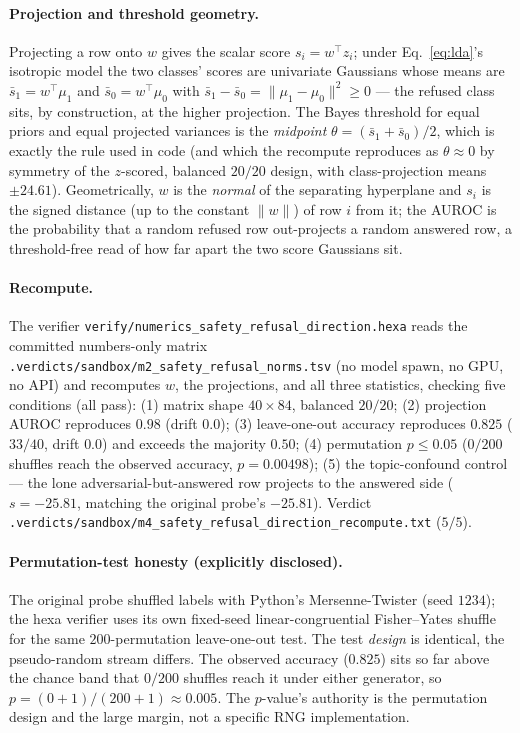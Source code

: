\documentclass[11pt,a4paper]{article}
\begin{document}
\paragraph{Projection and threshold geometry.} Projecting a row onto \(w\) gives
the scalar score \(s_i = w^{\top}z_i\); under Eq.~\eqref{eq:lda}'s isotropic
model the two classes' scores are univariate Gaussians whose means are
\(\bar s_1 = w^{\top}\mu_1\) and \(\bar s_0 = w^{\top}\mu_0\) with
\(\bar s_1 - \bar s_0 = \lVert\mu_1-\mu_0\rVert^2 \ge 0\) --- the refused class
sits, by construction, at the higher projection. The Bayes threshold for equal
priors and equal projected variances is the \emph{midpoint}
\(\theta = (\bar s_1+\bar s_0)/2\), which is exactly the rule used in code (and
which the recompute reproduces as \(\theta \approx 0\) by symmetry of the
\(z\)-scored, balanced \(20/20\) design, with class-projection means
\(\pm 24.61\)). Geometrically, \(w\) is the \emph{normal} of the separating
hyperplane and \(s_i\) is the signed distance (up to the constant
\(\lVert w\rVert\)) of row \(i\) from it; the AUROC is the probability that a
random refused row out-projects a random answered row, a threshold-free read of
how far apart the two score Gaussians sit.

\paragraph{Recompute.} The verifier
\texttt{verify/numerics\_safety\_refusal\_direction.hexa} reads the committed
numbers-only matrix \texttt{.verdicts/sandbox/m2\_safety\_refusal\_norms.tsv}
(no model spawn, no GPU, no API) and recomputes \(w\), the projections, and all
three statistics, checking five conditions (all pass): (1) matrix shape
\(40\times84\), balanced \(20/20\); (2) projection AUROC reproduces \(0.98\)
(drift \(0.0\)); (3) leave-one-out accuracy reproduces \(0.825\) (\(33/40\),
drift \(0.0\)) and exceeds the majority \(0.50\); (4) permutation \(p\le0.05\)
(\(0/200\) shuffles reach the observed accuracy, \(p{=}0.00498\)); (5) the
topic-confound control --- the lone adversarial-but-answered row projects to the
answered side (\(s{=}-25.81\), matching the original probe's \(-25.81\)).
Verdict \texttt{.verdicts/sandbox/m4\_safety\_refusal\_direction\_recompute.txt}
(\(5/5\)).

\paragraph{Permutation-test honesty (explicitly disclosed).} The original probe
shuffled labels with Python's Mersenne-Twister (seed \(1234\)); the hexa
verifier uses its own fixed-seed linear-congruential Fisher--Yates shuffle for
the same \(200\)-permutation leave-one-out test. The test \emph{design} is
identical, the pseudo-random stream differs. The observed accuracy
(\(0.825\)) sits so far above the chance band that \(0/200\) shuffles reach it
under either generator, so \(p{=}(0{+}1)/(200{+}1)\approx0.005\). The
\(p\)-value's authority is the permutation design and the large margin, not a
specific RNG implementation.
\end{document}
